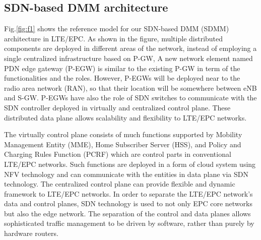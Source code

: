 \documentclass[runningheads,a4paper]{llncs}
\begin{document}
\subsection{SDN-based DMM architecture}
\vspace{-0.2cm}
Fig.\ref{fig:f1} shows the reference model for our SDN-based DMM (SDMM) architecture in LTE/EPC. As shown in the figure, multiple distributed components are deployed in different areas of the network, instead of employing a single centralized infrastructure based on P-GW,  A new network element named PDN edge gateway (P-EGW) is similar to the existing P-GW in term of the functionalities and the roles. However, P-EGWs will be deployed near to the radio area network (RAN), so that their location will be somewhere between eNB and S-GW. P-EGWs have also the role of SDN switches to communicate with the SDN controller deployed in virtually and centralized control plane. These distributed data plane allows scalability and flexibility to LTE/EPC networks.

The virtually control plane consists of much functions supported by Mobility Management Entity (MME), Home Subscriber Server (HSS), and Policy and Charging Rules Function (PCRF) which are control parts in conventional LTE/EPC networks. Such functions are deployed in a form of cloud system using NFV technology and can communicate with the entities in data plane via SDN technology. The centralized control plane can provide flexible and dynamic framework to LTE/EPC networks. In order to separate the LTE/EPC network's data and control planes, SDN technology is used to not only EPC core networks but also the edge network. The separation of the control and data planes allows sophisticated traffic management to be driven by software, rather than purely by hardware routers.
\end{document}
